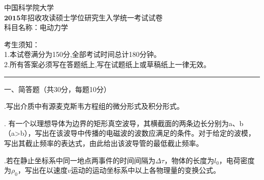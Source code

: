 \begin{center}
	\heiti
	\LARGE{ 中国科学院大学\\$\boldsymbol{2015}$年招收攻读硕士学位研究生入学统一考试试卷\\
	科目名称：电动力学}

\end{center}
\noindent
考生须知：\\
1.本试卷满分为150分,全部考试时间总计180分钟。\\
2.所有答案必须写在答题纸上,写在试题纸上或草稿纸上一律无效。

\vspace*{2ex}
\hrule
\vspace*{4ex}


\setcounter{page}{1}%
\pagestyle{mypagestyle}

\onehalfspacing

\vspace{0.4cm}

\noindent
一、简答题（共30分，每题10分）
\vspace{0.2cm}

.\hspace{0.8em}写出介质中有源麦克斯韦方程组的微分形式及积分形式。
\vspace{0.3cm}

.\hspace{0.8em}
有一个以理想导体为边界的矩形真空波导，其横截面的两条边长分别为a、b（a>b），写出在该波导中传播的电磁波的波数应满足的条件。对于给定的波模，写出其截止频率的表达式，由此给出该波导管的最低截止频率。\vspace{0.3cm}

.\hspace{0.8em}若在静止坐标系中同一地点两事件的时间间隔为$\Delta \tau$，物体的长度为$l_0$，电荷密度为$\rho_0$，写出在以速度$v$运动的运动坐标系中以上各物理量的变换公式。
\vspace{0.5cm}

